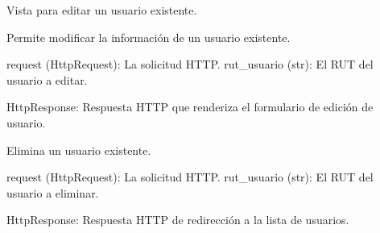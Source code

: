 \documentclass[letterpaper,10pt,spanish]{sphinxmanual}
\begin{document}
\begin{fulllineitems}
\label{\detokenize{modules/appusuarios:appusuarios.views.editar}}
\pysigstartsignatures
{}
\pysigstopsignatures
\sphinxAtStartPar
Vista para editar un usuario existente.

\sphinxAtStartPar
Permite modificar la información de un usuario existente.
\begin{description}
\sphinxAtStartPar
request (HttpRequest): La solicitud HTTP.
rut\_usuario (str): El RUT del usuario a editar.

\sphinxAtStartPar
HttpResponse: Respuesta HTTP que renderiza el formulario de edición de usuario.

\end{description}

\end{fulllineitems}


\begin{fulllineitems}
\label{\detokenize{modules/appusuarios:appusuarios.views.eliminar}}
\pysigstartsignatures
{}
\pysigstopsignatures
\sphinxAtStartPar
Elimina un usuario existente.
\begin{description}
\sphinxAtStartPar
request (HttpRequest): La solicitud HTTP.
rut\_usuario (str): El RUT del usuario a eliminar.

\sphinxAtStartPar
HttpResponse: Respuesta HTTP de redirección a la lista de usuarios.

\end{description}

\end{fulllineitems}

\end{document}
